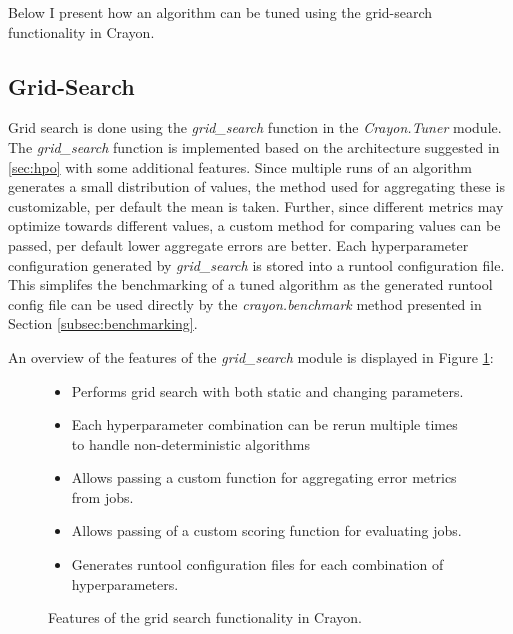 Below I present how an algorithm can be tuned using the grid-search functionality in Crayon.

\subsection{Grid-Search}
Grid search is done using the \textit{grid\_search} function in the \textit{Crayon.Tuner} module. The \textit{grid\_search} function is implemented based on the architecture suggested in \ref{sec:hpo} with some additional features. Since multiple runs of an algorithm generates a small distribution of values, the method used for aggregating these is customizable, per default the mean is taken. Further, since different metrics may optimize towards different values, a custom method for comparing values can be passed, per default lower aggregate errors are better. Each hyperparameter configuration generated by \textit{grid\_search} is stored into a runtool configuration file. This simplifes the benchmarking of a tuned algorithm as the generated runtool config file can be used directly by the \textit{crayon.benchmark} method presented in Section \ref{subsec:benchmarking}.

An overview of the features of the \textit{grid\_search} module is displayed in Figure \ref{features_grid_search}:

\begin{figure}[h]
  \begin{itemize}
    \item Performs grid search with both static and changing parameters.
    \item Each hyperparameter combination can be rerun multiple times to handle non-deterministic algorithms
    \item Allows passing a custom function for aggregating error metrics from jobs.
    \item Allows passing of a custom scoring function for evaluating jobs.
    \item Generates runtool configuration files for each combination of hyperparameters.
  \end{itemize}
  \caption{Features of the grid search functionality in Crayon.}
  \label{features_grid_search}
\end{figure}


